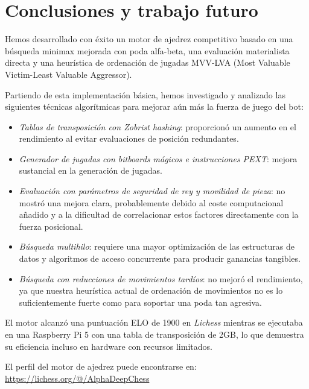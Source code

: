 \chapter{Conclusiones y trabajo futuro}

Hemos desarrollado con éxito un motor de ajedrez competitivo basado en una búsqueda minimax mejorada con poda alfa-beta, una evaluación materialista directa y una heurística de ordenación de jugadas MVV-LVA (Most Valuable Victim-Least Valuable Aggressor).

\vspace{1em}

\noindent Partiendo de esta implementación básica, hemos investigado y analizado las siguientes técnicas algorítmicas para mejorar aún más la fuerza de juego del bot:

\begin{itemize}[itemsep=1pt]
    \item \textit{Tablas de transposición con Zobrist hashing}: proporcionó un aumento en el rendimiento al evitar evaluaciones de posición redundantes.
    \item \textit{Generador de jugadas con bitboards mágicos e instrucciones PEXT}: mejora sustancial en la generación de jugadas.
    \item \textit{Evaluación con parámetros de seguridad de rey y movilidad de pieza}: no mostró una mejora clara, probablemente debido al coste computacional añadido y a la dificultad de correlacionar estos factores directamente con la fuerza posicional.
    \item \textit{Búsqueda multihilo}: requiere una mayor optimización de las estructuras de datos y algoritmos de acceso concurrente para producir ganancias tangibles.
    \item \textit{Búsqueda con reducciones de movimientos tardíos}: no mejoró el rendimiento, ya que nuestra heurística actual de ordenación de movimientos no es lo suficientemente fuerte como para soportar una poda tan agresiva.
\end{itemize}

\noindent El motor alcanzó una puntuación ELO de 1900 en \textit{Lichess} mientras se ejecutaba en una Raspberry Pi 5 con una tabla de transposición de 2GB, lo que demuestra su eficiencia incluso en hardware con recursos limitados.

\vspace{1em}

\noindent El perfil del motor de ajedrez puede encontrarse en: \\
\url{https://lichess.org/@/AlphaDeepChess}


